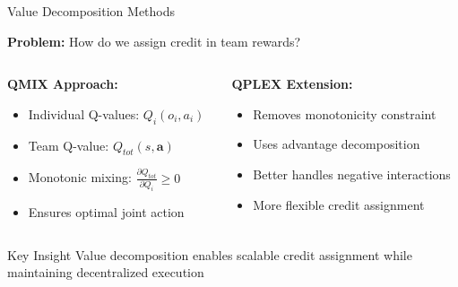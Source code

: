 \documentclass[aspectratio=169]{beamer}
\begin{document}
\begin{frame}{Value Decomposition Methods}
    
    \textbf{Problem:} How do we assign credit in team rewards?
    
    \vfill
    
    \begin{columns}
        \begin{column}{0.5\textwidth}
            \textbf{QMIX Approach:} \autocite{rashid_monotonic_2020}
            \begin{itemize}
                \item Individual Q-values: $Q_i(o_i, a_i)$
                \item Team Q-value: $Q_{tot}(s, \mathbf{a})$
                \item Monotonic mixing: $\frac{\partial Q_{tot}}{\partial Q_i} \geq 0$
                \item Ensures optimal joint action
            \end{itemize}
        \end{column}
        \begin{column}{0.5\textwidth}
            \textbf{QPLEX Extension:} \autocite{wang_qplex_2021}
            \begin{itemize}
                \item Removes monotonicity constraint
                \item Uses advantage decomposition
                \item Better handles negative interactions
                \item More flexible credit assignment
            \end{itemize}
        \end{column}
    \end{columns}
    
    \vfill
    \begin{alertblock}{Key Insight}
        Value decomposition enables scalable credit assignment while maintaining decentralized execution
    \end{alertblock}
\end{frame}
\end{document}
